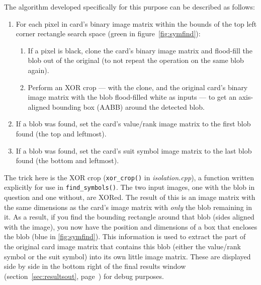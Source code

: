 \documentclass[a4paper,12pt,notitlepage]{article}
\newcommand{\secref}[1]{(section~\ref{#1}, page~\pageref{#1})}
\newcommand{\code}[1]{\lstinline[basicstyle=\ttfamily,breakautoindent=false,postbreak={}]|#1|}
\begin{document}
		The algorithm developed specifically for this purpose can be described as follows:

		\begin{enumerate}
			\item For each pixel in card's binary image matrix within the bounds of the top left corner rectangle search space (green in figure~\ref{fig:symfind}):
			\begin{enumerate}
				\item If a pixel is black, clone the card's binary image matrix and flood-fill the blob out of the original (to not repeat the operation on the same blob again).
				\item Perform an XOR crop --- with the clone, and the original card's binary image matrix with the blob flood-filled white as inputs --- to get an axis-aligned bounding box (AABB) around the detected blob.
			\end{enumerate}
			\item If a blob was found, set the card's value/rank image matrix to the first blob found (the top and leftmost).
			\item If a blob was found, set the card's suit symbol image matrix to the last blob found (the bottom and leftmost).
		\end{enumerate}

		The trick here is the XOR crop (\code{xor_crop()} in \emph{isolation.cpp}), a function written explicitly for use in \code{find_symbols()}. The two input images, one with the blob in question and one without, are XORed. The result of this is an image matrix with the same dimensions as the card's image matrix with \emph{only} the blob remaining in it. As a result, if you find the bounding rectangle around that blob (sides aligned with the image), you now have the position and dimensions of a box that encloses the blob (blue in \ref{fig:symfind}). This information is used to extract the part of the original card image matrix that contains this blob (either the value/rank symbol or the suit symbol) into its own little image matrix. These are displayed side by side in the bottom right of the final results window \secref{sec:resultsout} for debug purposes.
\end{document}
